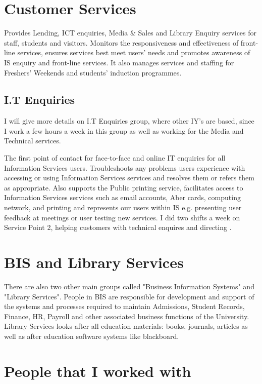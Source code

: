 \documentclass[10pt,a4paper,headinclude=true]{report}
\begin{document}
\section{Customer Services}
Provides Lending, ICT enquiries, Media \& Sales and Library Enquiry services for staff, students and visitors. Monitors the responsiveness and effectiveness of front-line services, ensures services best meet users' needs and promotes awareness of IS enquiry and front-line services. It also manages services and staffing for Freshers' Weekends and students' induction programmes.

\subsection{I.T Enquiries}
I will give more details on I.T Enquiries group, where other IY's are based, since I work a few hours a week in this group as well as working for the Media and Technical services.

The first point of contact for face-to-face and online IT enquiries for all Information Services users. Troubleshoots any problems users experience with accessing or using Information Services services and resolves them or refers them as appropriate. Also supports the Public printing service, facilitates access to Information Services services such as email accounts, Aber cards, computing network, and printing and represents our users within IS e.g. presenting user feedback at meetings or user testing new services. I did two shifts a week on Service Point 2, helping customers with technical enquires and directing .

\section{BIS and Library Services}
There are also two other main groups called "Business Information Systems" and "Library Services". People in BIS are  responsible for development and support of the systems and processes required to maintain Admissions, Student Records, Finance, HR, Payroll and other associated business functions of the University. Library Services looks after all education materials: books, journals, articles as well as after education software systems like blackboard.


\section{People that I worked with}
\end{document}

